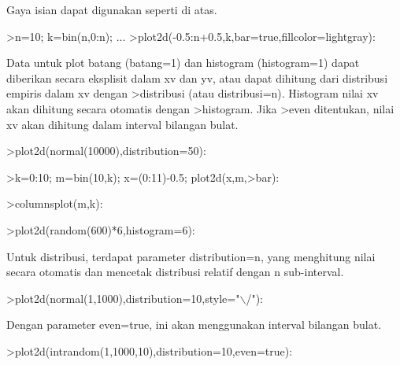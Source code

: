 \documentclass[a4paper,10pt]{article}
\begin{document}
\begin{eulernotebook}
\begin{eulercomment}
\begin{eulercomment}
\begin{eulercomment}
\begin{eulercomment}
\begin{eulercomment}
\begin{eulercomment}
\begin{eulercomment}
Gaya isian dapat digunakan seperti di atas.
\end{eulercomment}
\begin{eulerprompt}
>n=10; k=bin(n,0:n); ...
>plot2d(-0.5:n+0.5,k,bar=true,fillcolor=lightgray):
\end{eulerprompt}
\begin{eulercomment}
Data untuk plot batang (batang=1) dan histogram (histogram=1) dapat
diberikan secara eksplisit dalam xv dan yv, atau dapat dihitung dari
distribusi empiris dalam xv dengan \textgreater{}distribusi (atau distribusi=n).
Histogram nilai xv akan dihitung secara otomatis dengan \textgreater{}histogram.
Jika \textgreater{}even ditentukan, nilai xv akan dihitung dalam interval bilangan
bulat.
\end{eulercomment}
\begin{eulerprompt}
>plot2d(normal(10000),distribution=50):
\end{eulerprompt}
\begin{eulerprompt}
>k=0:10; m=bin(10,k); x=(0:11)-0.5; plot2d(x,m,>bar):
\end{eulerprompt}
\begin{eulerprompt}
>columnsplot(m,k):
\end{eulerprompt}
\begin{eulerprompt}
>plot2d(random(600)*6,histogram=6):
\end{eulerprompt}
\begin{eulercomment}
Untuk distribusi, terdapat parameter distribution=n, yang menghitung
nilai secara otomatis dan mencetak distribusi relatif dengan n
sub-interval.
\end{eulercomment}
\begin{eulerprompt}
>plot2d(normal(1,1000),distribution=10,style="\(\backslash\)/"):
\end{eulerprompt}
\begin{eulercomment}
Dengan parameter even=true, ini akan menggunakan interval bilangan
bulat.
\end{eulercomment}
\begin{eulerprompt}
>plot2d(intrandom(1,1000,10),distribution=10,even=true):

\end{eulerprompt}
\end{eulercomment}
\end{eulercomment}
\end{eulercomment}
\end{eulercomment}
\end{eulercomment}
\end{eulercomment}
\end{eulernotebook}
\end{document}
